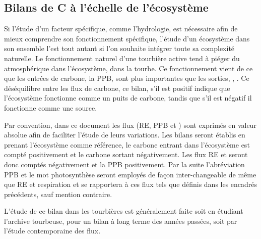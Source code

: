 \subsection{Bilans de C à l'échelle de l'écosystème}

Si l'étude d'un facteur spécifique, comme l'hydrologie, est nécessaire afin de mieux comprendre son fonctionnement spécifique, l'étude d'un écosystème dans son ensemble l'est tout autant si l'on souhaite intégrer toute sa complexité naturelle.
Le fonctionnement naturel d'une tourbière active tend à piéger du \coo atmosphérique dans l'écosystème, dans la tourbe.
Ce fonctionnement vient de ce que les entrées de carbone, la PPB, sont plus importantes que les sorties, \coo, \chh.
Ce déséquilibre entre les flux de carbone, ce bilan, s'il est positif indique que l'écosystème fonctionne comme un puits de carbone, tandis que s'il est négatif il fonctionne comme une source.

Par convention, dans ce document les flux (RE, PPB et \fchh) sont exprimés en valeur absolue afin de faciliter l'étude de leurs variations.
Les bilans seront établis en prenant l'écosystème comme référence, le carbone entrant dans l'écosystème est compté positivement et le carbone sortant négativement.
Les flux RE et \fchh seront donc comptés négativement et la PPB positivement.
Par la suite l'abréviation PPB et le mot photosynthèse seront employés de façon inter-changeable de même que RE et respiration et se rapportera à ces flux tels que définis dans les encadrés précédents, sauf mention contraire.

L'étude de ce bilan dans les tourbières est généralement faite soit en étudiant l'archive tourbeuse, pour un bilan à long terme des années passées, soit par l'étude contemporaine des flux.


